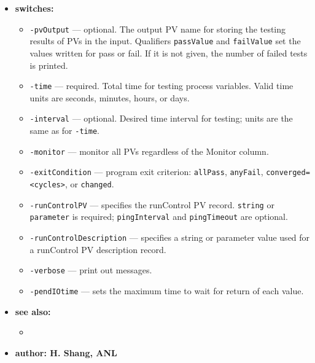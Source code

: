 \begin{itemize}
%
\item {\bf switches:}
%
%
    \begin{itemize}
%
%
        \item {\tt -pvOutput} --- optional. The output PV name for storing the testing results
               of PVs in the input. Qualifiers \verb|passValue| and \verb|failValue| set
               the values written for pass or fail. If it is not given, the number of
               failed tests is printed.
        \item {\tt -time} --- required. Total time for testing process variables.
               Valid time units are seconds, minutes, hours, or days.
        \item {\tt -interval} --- optional. Desired time interval for testing; units are the
               same as for \verb|-time|.
        \item {\tt -monitor} --- monitor all PVs regardless of the Monitor column.
        \item {\tt -exitCondition} --- program exit criterion: \verb|allPass|, \verb|anyFail|,
               \verb|converged=<cycles>|, or \verb|changed|.
        \item {\tt -runControlPV} --- specifies the runControl PV record. \verb|string| or
               \verb|parameter| is required; \verb|pingInterval| and \verb|pingTimeout|
               are optional.
        \item {\tt -runControlDescription} --- specifies a string or parameter value used
               for a runControl PV description record.
        \item {\tt -verbose} --- print out messages.
        \item {\tt -pendIOtime} --- sets the maximum time to wait for return of each value.
    \end{itemize}
\item {\bf see also:}
    \begin{itemize}
%
%
    \item {}
    \end{itemize}
%
%
\item {\bf author: H. Shang, ANL}
\end{itemize}
